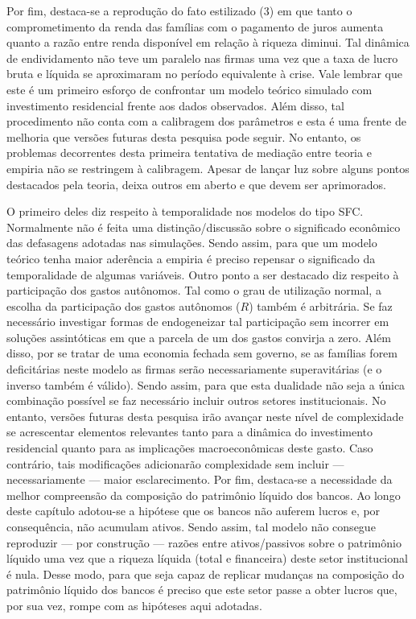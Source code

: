 Por fim, destaca-se a reprodução do fato estilizado (3) em que tanto o comprometimento da renda das famílias com o pagamento de juros aumenta quanto a razão entre renda disponível em relação à riqueza diminui. Tal dinâmica de endividamento não teve um paralelo nas firmas uma vez que a taxa de lucro bruta e líquida se aproximaram no período equivalente à crise. 
Vale lembrar que este é um primeiro esforço de confrontar um modelo teórico simulado com investimento residencial frente aos dados observados.
Além disso, tal procedimento não conta com a calibragem dos parâmetros e esta é uma frente de melhoria que versões futuras desta pesquisa pode seguir.
No entanto, os problemas decorrentes desta primeira tentativa de mediação entre teoria e empiria não se restringem à calibragem. 
Apesar de lançar luz sobre alguns pontos destacados pela teoria, deixa outros em aberto e que devem ser aprimorados.

O primeiro deles diz respeito à temporalidade nos modelos do tipo SFC. Normalmente não é feita uma distinção/discussão sobre o significado econômico das defasagens adotadas nas simulações. Sendo assim, para que um modelo teórico tenha maior aderência a empiria é preciso repensar o significado da temporalidade de algumas variáveis. Outro ponto a ser destacado diz respeito à participação dos gastos autônomos. Tal como o grau de utilização normal, a escolha da participação dos gastos autônomos ($R$) também é arbitrária. Se faz necessário investigar formas de endogeneizar tal participação sem incorrer em soluções assintóticas em que a parcela de um dos gastos convirja a zero. Além disso, por se tratar de uma economia fechada sem governo, se as famílias forem deficitárias neste modelo as firmas serão necessariamente superavitárias (e o inverso também é válido).
Sendo assim, para que esta dualidade não seja a única combinação possível se faz necessário incluir outros setores institucionais. No entanto, versões futuras desta pesquisa irão avançar neste nível de complexidade se acrescentar elementos relevantes tanto para a dinâmica do investimento residencial quanto para as implicações macroeconômicas deste gasto. Caso contrário, tais modificações adicionarão complexidade sem incluir --- necessariamente --- maior esclarecimento.
Por fim, destaca-se a necessidade da melhor compreensão da composição do patrimônio líquido dos bancos. Ao longo deste capítulo adotou-se a hipótese que os bancos não auferem lucros e, por consequência, não acumulam ativos.
Sendo assim, tal modelo não consegue reproduzir --- por construção --- razões entre ativos/passivos sobre o patrimônio líquido uma vez que a riqueza líquida (total e financeira) deste setor institucional é nula.
Desse modo, para que seja capaz de replicar mudanças na composição do patrimônio líquido dos bancos é preciso que este setor passe a obter lucros que, por sua vez, rompe com as hipóteses aqui adotadas.

